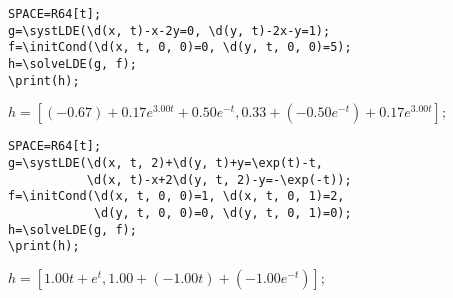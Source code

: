 \begin{verbatim}
SPACE=R64[t];
g=\systLDE(\d(x, t)-x-2y=0, \d(y, t)-2x-y=1);
f=\initCond(\d(x, t, 0, 0)=0, \d(y, t, 0, 0)=5);
h=\solveLDE(g, f); 
\print(h);
\end{verbatim}

{$h = [(-0. 67)+0. 17 e^{3. 00t}+0. 50 e^{-t}, 0. 33+(-0. 50 e^{-t})+0. 17 e^{3. 00t}];$}

\begin{verbatim}
SPACE=R64[t];
g=\systLDE(\d(x, t, 2)+\d(y, t)+y=\exp(t)-t, 
           \d(x, t)-x+2\d(y, t, 2)-y=-\exp(-t));
f=\initCond(\d(x, t, 0, 0)=1, \d(x, t, 0, 1)=2, 
            \d(y, t, 0, 0)=0, \d(y, t, 0, 1)=0);
h=\solveLDE(g, f); 
\print(h);
\end{verbatim}

{$h = [1. 00 t+e^{t}, 1. 00+(-1. 00 t)+(-1. 00 e^{-t})];$}

